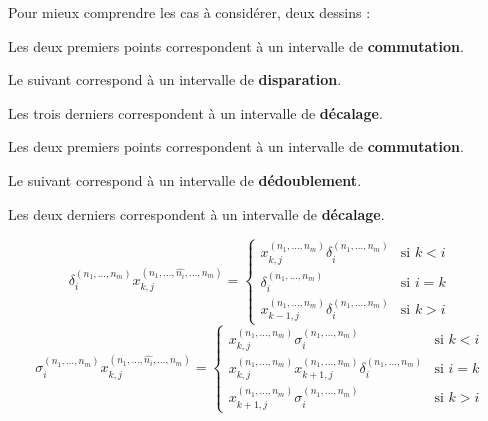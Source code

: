 \documentclass{article}
\theoremstyle{definition}
\theoremstyle{definition}
\theoremstyle{remark}
\begin{document}
Pour mieux comprendre les cas à considérer, deux dessins :


Les deux premiers points correspondent à un intervalle de \textbf{commutation}.

Le suivant correspond à un intervalle de \textbf{disparation}.

Les trois derniers correspondent à un intervalle de \textbf{décalage}.


Les deux premiers points correspondent à un intervalle de \textbf{commutation}.

Le suivant correspond à un intervalle de \textbf{dédoublement}.

Les deux derniers correspondent à un intervalle de \textbf{décalage}.

\[
  \delta^{(n_1,\dots,n_m)}_i x^{(n_1,\dots,\hat{n_i},\dots,n_m)}_{k,j} =
    \begin{cases}
      x^{(n_1,\dots,n_m)}_{k,j} \delta^{(n_1,\dots,n_m)}_i& \text{si $k<i$}\\
      \delta^{(n_1,\dots,n_m)}_i & \text{si $i=k$}\\
      x^{(n_1,\dots,n_m)}_{k-1,j} \delta^{(n_1,\dots,n_m)}_{i} & \text{si $k>i$}
    \end{cases}
\]
\[
  \sigma^{(n_1,\dots,n_m)}_i x^{(n_1,\dots,\hat{n_i},\dots,n_m)}_{k,j} =
    \begin{cases}
      x^{(n_1,\dots,n_m)}_{k,j} \sigma^{(n_1,\dots,n_m)}_i& \text{si $k<i$}\\
      x^{(n_1,\dots,n_m)}_{k,j}x^{(n_1,\dots,n_m)}_{k+1,j}\delta^{(n_1,\dots,n_m)}_i & \text{si $i=k$}\\
      x^{(n_1,\dots,n_m)}_{k+1,j} \sigma^{(n_1,\dots,n_m)}_{i} & \text{si $k>i$}
    \end{cases}
\]
\end{document}
